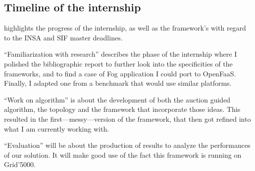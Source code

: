 \subsection{Timeline of the internship}

 highlights the progress of the internship, as well as the framework's with regard to the INSA and SIF master deadlines.

\begin{description}
    \item{“Familiarization with research”} describes the phase of the internship where I polished the bibliographic report to further look into the specificities of the frameworks, and to find a case of Fog application I could port to OpenFaaS. Finally, I adapted one from a benchmark that would use similar platforms.
    \item{“Work on algorithm”} is about the development of both the auction guided algorithm, the topology and the framework that incorporate those ideas. This resulted in the first—messy—version of the framework, that then got refined into what I am currently working with.
    \item{“Evaluation”} will be about the production of results to analyze the performances of our solution. It will make good use of the fact this framework is running on Grid'5000.
\end{description}

